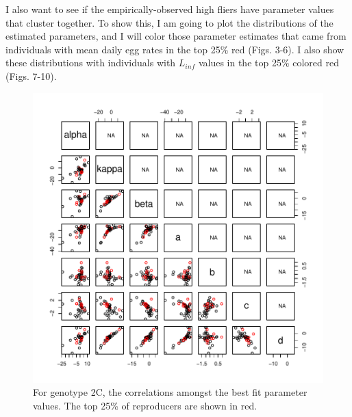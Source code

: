 \documentclass[12pt,reqno,final]{amsart}
\theoremstyle{plain}
\numberwithin{equation}{part}
\begin{document}
I also want to see if the empirically-observed high fliers have
parameter values that cluster together. To show this, I am going to
plot the distributions of the estimated parameters, and I will color
those parameter estimates that came from individuals with mean daily
egg rates in the top 25\% red (Figs. 3-6).  I also show these distributions with
individuals with $L_{inf}$ values in the top 25\% colored red (Figs. 7-10).

\begin{figure}
\includegraphics{Comparing_best_fit_parameters_against_Adriana_winners_and_losers-003}
\caption{For genotype 2C, the correlations amongst the best fit
  parameter values. The top 25\% of reproducers are shown in red.}
\end{figure}
\end{document}
